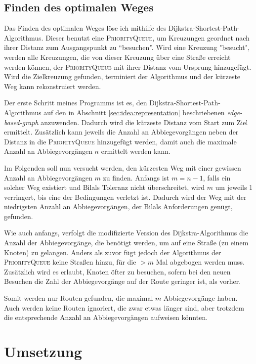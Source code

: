 \documentclass[a4paper,10pt,ngerman]{scrartcl}
\begin{document}
\subsection{Finden des optimalen Weges}
Das Finden des optimalen Weges löse ich mithilfe des Dijkstra-Shortest-Path-Algorithmus.
Dieser benutzt eine \textsc{PriorityQueue}, um Kreuzungen geordnet nach ihrer Distanz zum Ausgangspunkt zu \enquote{besuchen}.
Wird eine Kreuzung "besucht", werden alle Kreuzungen, die von dieser Kreuzung über eine Straße erreicht werden können, der \textsc{PriorityQueue} mit ihrer Distanz vom Ursprung hinzugefügt.
Wird die Zielkreuzung gefunden, terminiert der Algorithmus und der kürzeste Weg kann rekonstruiert werden.

Der erste Schritt meines Programms ist es, den Dijkstra-Shortest-Path-Algorithmus auf den in Abschnitt \ref{sec:idea:representation} beschriebenen \textit{edge-based-graph} anzuwenden.
Dadurch wird die kürzeste Distanz vom Start zum Ziel ermittelt.
Zusätzlich kann jeweils die Anzahl an Abbiegevorgängen neben der Distanz in die \textsc{PriorityQueue} hinzugefügt werden, damit auch die maximale Anzahl an Abbiegevorgängen $n$ ermittelt werden kann.

Im Folgenden soll nun versucht werden, den kürzesten Weg mit einer gewissen Anzahl an Abbiegevorgängen $m$ zu finden.
Anfangs ist $m = n - 1$, falls ein solcher Weg existiert und Bilals Toleranz nicht überschreitet, wird $m$ um jeweils 1 verringert, bis eine der Bedingungen verletzt ist.
Dadurch wird der Weg mit der niedrigsten Anzahl an Abbiegevorgängen, der Bilals Anforderungen genügt, gefunden.

Wie auch anfangs, verfolgt die modifizierte Version des Dijkstra-Algorithmus die Anzahl der Abbiegevorgänge, die benötigt werden, um auf eine Straße (zu einem Knoten) zu gelangen.
Anders als zuvor fügt jedoch der Algorithmus der \textsc{PriorityQueue} keine Straßen hinzu, für die $>m$ Mal abgebogen werden muss.
Zusätzlich wird es erlaubt, Knoten öfter zu besuchen, sofern bei den neuen Besuchen die Zahl der Abbiegevorgänge auf der Route geringer ist, als vorher.

Somit werden nur Routen gefunden, die maximal $m$ Abbiegevorgänge haben.
Auch werden keine Routen ignoriert, die zwar etwas länger sind, aber trotzdem die entsprechende Anzahl an Abbiegevorgängen aufweisen könnten.

\section{Umsetzung}
\end{document}
